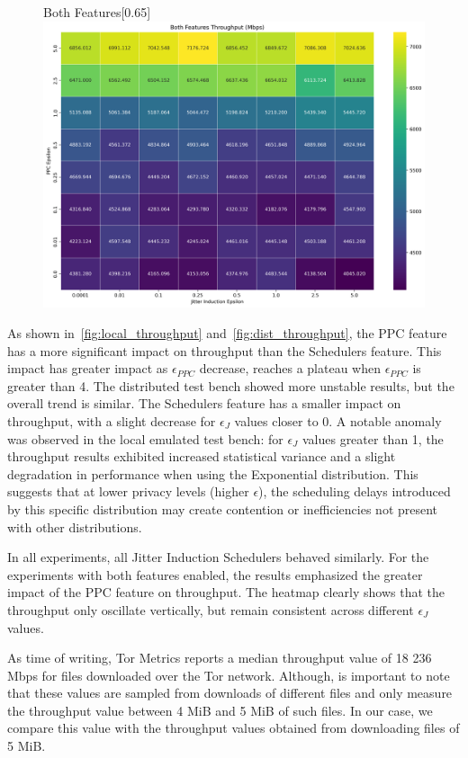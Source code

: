 \begin{figure}[htbp]
\begin{subcaptionbox}{Both Features\label{fig:dist_both_throughput}}[0.65\textwidth]
        {\includegraphics[width=\linewidth]{Chapters/Figures/Plots/dist_throughput_50_heatmap_5mib.png}}
    \end{subcaptionbox}
\end{figure}

As shown in~\autoref{fig:local_throughput} and~\autoref{fig:dist_throughput}, the PPC feature has a more significant impact on throughput than the Schedulers feature. 
This impact has greater impact as $\epsilon_{PPC}$ decrease, reaches a plateau when $\epsilon_{PPC}$ is greater than 4. The distributed test bench showed more unstable results, but the overall trend is similar. The Schedulers feature has a smaller impact on throughput, with a slight decrease for $\epsilon_{J}$ values closer to 0. A notable anomaly was observed in the local emulated test bench: for $\epsilon_{J}$ values greater than 1, the throughput results exhibited increased statistical variance and a slight degradation in performance when using the Exponential distribution. This suggests that at lower privacy levels (higher $\epsilon$), the scheduling delays introduced by this specific distribution may create contention or inefficiencies not present with other distributions.

In all experiments, all Jitter Induction Schedulers behaved similarly.
For the experiments with both features enabled, the results emphasized the greater impact of the PPC feature on throughput. The heatmap clearly shows that the throughput only oscillate vertically, but remain consistent across different $\epsilon_{J}$ values.

As time of writing, Tor Metrics reports a median throughput value of 18 236 Mbps for files downloaded over the Tor network. Although, is important to note that these values are sampled from downloads of different files and only measure the throughput value between 4 MiB and 5 MiB of such files. In our case, we compare this value with the throughput values obtained from downloading files of 5 MiB.

